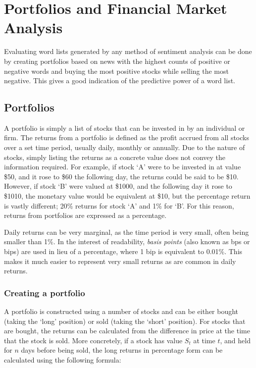 

\section{Portfolios and Financial Market Analysis}
Evaluating word lists generated by any method of sentiment analysis can be done by creating portfolios based on news with the highest counts of positive or negative words and buying the most positive stocks while selling the most negative. This gives a good indication of the predictive power of a word list.

\subsection{Portfolios}
A portfolio is simply a list of stocks that can be invested in by an individual or firm. The returns from a portfolio is defined as the profit accrued from all stocks over a set time period, usually daily, monthly or annually. Due to the nature of stocks, simply listing the returns as a concrete value does not convey the information required. For example, if stock `A' were to be invested in at value \$50, and it rose to \$60 the following day, the returns could be said to be \$10. However, if stock `B' were valued at \$1000, and the following day it rose to \$1010, the monetary value would be equivalent at \$10, but the percentage return is vastly different; 20\% returns for stock `A' and 1\% for `B'. For this reason, returns from portfolios are expressed as a percentage.

Daily returns can be very marginal, as the time period is very small, often being smaller than 1\%. In the interest of readability, \textit{basis points} (also known as bps or bips) are used in lieu of a percentage, where 1 bip is equivalent to 0.01\%. This makes it much easier to represent very small returns as are common in daily returns.

\subsubsection{Creating a portfolio}
A portfolio is constructed using a number of stocks and can be either bought (taking the `long' position) or sold (taking the `short' position). For stocks that are bought, the returns can be calculated from the difference in price at the time that the stock is sold. More concretely, if a stock has value $S_{t}$ at time $t$, and held for $n$ days before being sold, the long returns in percentage form can be calculated using the following formula:


